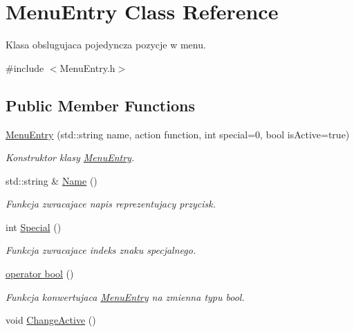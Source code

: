\hypertarget{class_menu_entry}{}\section{Menu\+Entry Class Reference}
\label{class_menu_entry}


Klasa obslugujaca pojedyncza pozycje w menu.  




{\ttfamily \#include $<$Menu\+Entry.\+h$>$}

\subsection*{Public Member Functions}
\begin{DoxyCompactItemize}
\item 
\hyperlink{class_menu_entry_a400100dee10c9aab7af558f854120fbd}{Menu\+Entry} (std\+::string name, action function, int special=0, bool is\+Active=true)
\begin{DoxyCompactList}\small\item\em Konstruktor klasy \hyperlink{class_menu_entry}{Menu\+Entry}. \end{DoxyCompactList}\item 
std\+::string \& \hyperlink{class_menu_entry_a94ce04cb1d1a97506416ab206665ed22}{Name} ()
\begin{DoxyCompactList}\small\item\em Funkcja zwracajace napis reprezentujacy przycisk. \end{DoxyCompactList}\item 
int \hyperlink{class_menu_entry_a8c3eb591798f523d010c21cbf8f2d6f7}{Special} ()
\begin{DoxyCompactList}\small\item\em Funkcja zwracajace indeks znaku specjalnego. \end{DoxyCompactList}\item 
\hyperlink{class_menu_entry_adb576d6c52b0065a9a3e0f200799ab19}{operator bool} ()
\begin{DoxyCompactList}\small\item\em Funkcja konwertujaca \hyperlink{class_menu_entry}{Menu\+Entry} na zmienna typu bool. \end{DoxyCompactList}\item 
\hypertarget{class_menu_entry_a2e8401a0092bd024580cd4f3c17820f9}{}void \hyperlink{class_menu_entry_a2e8401a0092bd024580cd4f3c17820f9}{Change\+Active} ()\label{class_menu_entry_a2e8401a0092bd024580cd4f3c17820f9}


\end{DoxyCompactItemize}
